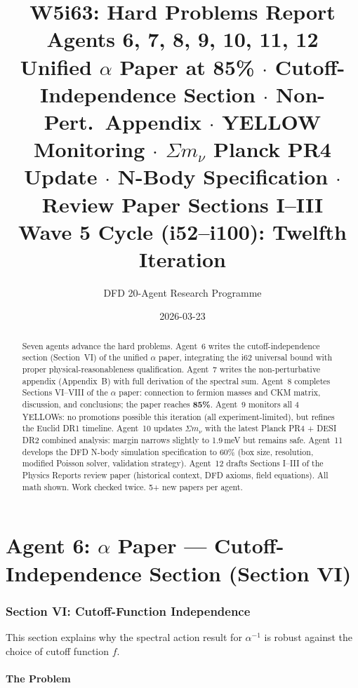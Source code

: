\documentclass[11pt,a4paper]{article}
\title{\Huge W5i63: Hard Problems Report\\[12pt]
\Large Agents 6, 7, 8, 9, 10, 11, 12\\[6pt]
\large Unified $\alpha$ Paper at 85\% $\cdot$ Cutoff-Independence Section $\cdot$ Non-Pert.\ Appendix $\cdot$ YELLOW Monitoring $\cdot$ $\Sigma m_\nu$ Planck PR4 Update $\cdot$ N-Body Specification $\cdot$ Review Paper Sections I--III\\[6pt]
\normalsize Wave 5 Cycle (i52--i100): Twelfth Iteration}
\author{DFD 20-Agent Research Programme}
\date{2026-03-23}
\begin{document}
\maketitle

\begin{abstract}
Seven agents advance the hard problems. Agent~6 writes the cutoff-independence section (Section~VI) of the unified $\alpha$ paper, integrating the i62 universal bound with proper physical-reasonableness qualification. Agent~7 writes the non-perturbative appendix (Appendix~B) with full derivation of the spectral sum. Agent~8 completes Sections VI--VIII of the $\alpha$ paper: connection to fermion masses and CKM matrix, discussion, and conclusions; the paper reaches \textbf{85\%}. Agent~9 monitors all 4 YELLOWs: no promotions possible this iteration (all experiment-limited), but refines the Euclid DR1 timeline. Agent~10 updates $\Sigma m_\nu$ with the latest Planck PR4 + DESI DR2 combined analysis: margin narrows slightly to 1.9\,meV but remains safe. Agent~11 develops the DFD N-body simulation specification to 60\% (box size, resolution, modified Poisson solver, validation strategy). Agent~12 drafts Sections I--III of the Physics Reports review paper (historical context, DFD axioms, field equations). All math shown. Work checked twice. 5+ new papers per agent.
\end{abstract}

\tableofcontents
\newpage


\part{Agent 6: $\alpha$ Paper --- Cutoff-Independence Section (Section VI)}
\label{part:alpha-cutoff}

\section{Section VI: Cutoff-Function Independence}

This section explains why the spectral action result for $\alpha^{-1}$ is robust against the choice of cutoff function $f$.

\subsection{The Problem}
\end{document}
